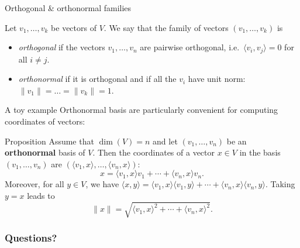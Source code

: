 \documentclass{beamer}
\begin{document}
\begin{frame}[t]{Orthogonal \& orthonormal families}
	\grid

\begin{definition}
	Let $v_1, \dots, v_k$ be vectors of $V$. We say that the family of vectors $(v_1, \dots, v_k)$ is
	\begin{itemize}
		\item \emph{orthogonal} if the vectors $v_1, \dots, v_n$ are pairwise orthogonal, i.e.\ $\langle v_i, v_j \rangle = 0$ for all $i \neq j$.
		\item \emph{orthonormal} if it is orthogonal and if all the $v_i$ have unit norm: $\|v_1\| = \dots = \|v_k\| = 1$.
	\end{itemize}
\end{definition}
\end{frame}

\begin{frame}[t]{A toy example}
Orthonormal basis are particularly convenient for computing coordinates of vectors:

\begin{block}{Proposition}
	Assume that $\dim(V)=n$ and let $(v_1, \dots, v_n)$ be an \textbf{orthonormal} basis of $V$. Then the coordinates of a vector $x \in V$ in the basis $(v_1, \dots, v_n)$ are $(\langle v_1, x\rangle, \dots, \langle v_n,x \rangle)$:
	$$
	x = \langle v_1, x \rangle v_1 + \cdots + \langle v_n, x \rangle v_n.
	$$
	Moreover, for all $y \in V$, we have $\langle x,y \rangle = \langle v_1,x\rangle\langle v_1,y\rangle + \cdots + \langle v_n,x\rangle\langle v_n,y\rangle$. Taking $y=x$ leads to
	$$
	\|x\| = \sqrt{\langle v_1, x \rangle^2 + \cdots + \langle v_n, x \rangle^2}.
	$$
\end{block}

\end{frame}

\appendix
\backupbegin
\begin{frame}
	\frametitle{Questions?}
\end{frame}
\backupend
\end{document}
